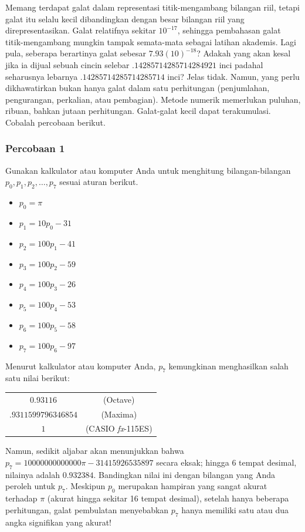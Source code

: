 Memang terdapat galat dalam representasi titik-mengambang bilangan
riil, tetapi galat itu selalu kecil dibandingkan dengan besar bilangan
riil yang direpresentasikan. Galat relatifnya sekitar $10^{-17}$,
sehingga pembahasan galat titik-mengambang mungkin tampak semata-mata
sebagai latihan akademis. Lagi pula, seberapa berartinya galat sebesar
$7.93(10)^{-18}$? Adakah yang akan kesal jika ia dijual sebuah cincin
selebar $.14285714285714284921$ inci padahal seharusnya lebarnya
$.14285714285714285714$ inci? Jelas tidak. Namun, yang perlu dikhawatirkan
bukan hanya galat dalam satu perhitungan (penjumlahan, pengurangan,
perkalian, atau pembagian). Metode numerik memerlukan puluhan, ribuan,
bahkan jutaan perhitungan. Galat-galat kecil dapat terakumulasi. Cobalah
percobaan berikut.

\subsubsection{Percobaan 1}

\noindent Gunakan kalkulator atau komputer Anda untuk menghitung bilangan-bilangan
$p_{0},p_{1},p_{2},\ldots,p_{7}$ sesuai aturan berikut.
\begin{itemize}
\item $p_{0}=\pi$
\item $p_{1}=10p_{0}-31$
\item $p_{2}=100p_{1}-41$
\item $p_{3}=100p_{2}-59$
\item $p_{4}=100p_{3}-26$
\item $p_{5}=100p_{4}-53$
\item $p_{6}=100p_{5}-58$
\item $p_{7}=100p_{6}-97$
\end{itemize}
Menurut kalkulator atau komputer Anda, $p_{7}$ kemungkinan menghasilkan
salah satu nilai berikut:

\begin{center}
\begin{tabular}{cc}
$0.93116$  & (Octave)\tabularnewline
$.9311599796346854$  & (Maxima)\tabularnewline
$1$ & (CASIO \textit{fx}-115ES)\tabularnewline
\end{tabular}
\par\end{center}

\noindent Namun, sedikit aljabar akan menunjukkan bahwa $p_{7}=10000000000000\pi-31415926535897$
secara eksak; hingga 6 tempat desimal, nilainya adalah $0.932384$.
Bandingkan nilai ini dengan bilangan yang Anda peroleh untuk $p_{7}$.
Meskipun $p_{0}$ merupakan hampiran yang sangat akurat terhadap $\pi$
(akurat hingga sekitar 16 tempat desimal), setelah hanya beberapa
perhitungan, galat pembulatan menyebabkan $p_{7}$ hanya memiliki
satu atau dua angka signifikan yang akurat!

